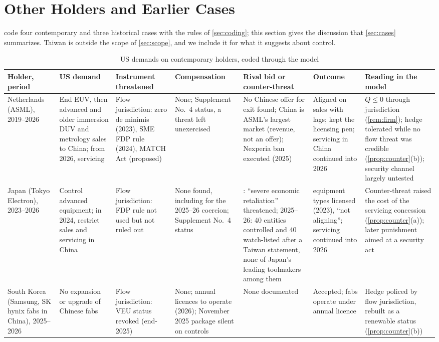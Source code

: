 \section{Other Holders and Earlier Cases}\label{app:cases}

 code four contemporary and three historical cases with the rules of \cref{sec:coding}; this section gives the discussion that \cref{sec:cases} summarizes. Taiwan is outside the scope of \cref{sec:scope}, and we include it for what it suggests about control.

\begin{table}[p]
\centering
\scriptsize
\setlength{\tabcolsep}{2.5pt}
\caption{US demands on contemporary holders, coded through the model}\label{tab:cases}
\begin{tabularx}{\textwidth}{@{}>{\raggedright\arraybackslash}p{1.7cm}*{6}{>{\raggedright\arraybackslash}X}@{}}
\toprule
Holder, period & US demand & Instrument threatened & Compensation & Rival bid or counter-threat & Outcome & Reading in the model\\
\midrule
Netherlands (ASML), 2019--2026 & End EUV, then advanced and older immersion DUV and metrology sales to China; from 2026, servicing & Flow jurisdiction: zero de minimis (2023), SME FDP rule (2024), MATCH Act (proposed) & None; Supplement No.~4 status, a threat left unexercised & No Chinese offer for exit found; China is ASML's largest market (revenue, not an offer); Nexperia ban executed (2025) & Aligned on sales with lags; kept the licensing pen; servicing in China continued into 2026 & $Q\le0$ through jurisdiction (\cref{rem:firm}); hedge tolerated while no flow threat was credible (\cref{prop:counter}(b)); security channel largely untested\\
\addlinespace
Japan (Tokyo Electron), 2023--2026 & Control advanced equipment; in 2024, restrict sales and servicing in China & Flow jurisdiction: FDP rule not used but not ruled out & None found, including for the 2025--26 coercion; Supplement No.~4 status & 2024: ``severe economic retaliation'' threatened; 2025--26: 40 entities controlled and 40 watch-listed after a Taiwan statement, none of Japan's leading toolmakers among them & 23 equipment types licensed (2023), ``not aligning''; servicing continued into 2026 & Counter-threat raised the cost of the servicing concession (\cref{prop:counter}(a)); later punishment aimed at a security act\\
\addlinespace
South Korea (Samsung, SK hynix fabs in China), 2025--2026 & No expansion or upgrade of Chinese fabs & Flow jurisdiction: VEU status revoked (end-2025) & None; annual licences to operate (2026); November 2025 package silent on controls & None documented & Accepted; fabs operate under annual licence & Hedge policed by flow jurisdiction, rebuilt as a renewable status (\cref{prop:counter}(b))\\

\end{tabularx}
\end{table}
